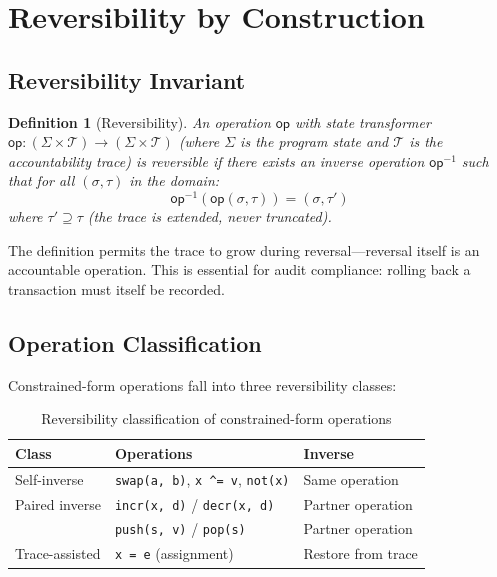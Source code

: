\documentclass[11pt,a4paper]{article}
\newtheorem{definition}[theorem]{Definition}
\newcommand{\inv}[1]{#1^{-1}}
\begin{document}
\section{Reversibility by Construction}
\label{sec:reversibility}

\subsection{Reversibility Invariant}

\begin{definition}[Reversibility]
\label{def:reversibility}
An operation $\mathsf{op}$ with state transformer
$\mathsf{op} : (\Sigma \times \mathcal{T}) \to (\Sigma \times \mathcal{T})$
(where $\Sigma$ is the program state and $\mathcal{T}$ is the accountability
trace) is \emph{reversible} if there exists an inverse operation
$\inv{\mathsf{op}}$ such that for all $(\sigma, \tau)$ in the domain:
\[
  \inv{\mathsf{op}}(\mathsf{op}(\sigma, \tau)) = (\sigma, \tau')
\]
where $\tau' \supseteq \tau$ (the trace is extended, never truncated).
\end{definition}

The definition permits the trace to grow during reversal---reversal itself is
an accountable operation.  This is essential for audit compliance: rolling
back a transaction must itself be recorded.

\subsection{Operation Classification}

Constrained-form operations fall into three reversibility classes:

\begin{table}[htbp]
\centering
\caption{Reversibility classification of constrained-form operations}
\label{tab:reversibility}
\begin{tabular}{@{}lll@{}}
\toprule
\textbf{Class} & \textbf{Operations} & \textbf{Inverse} \\
\midrule
Self-inverse & \texttt{swap(a, b)}, \texttt{x \^{}= v}, \texttt{not(x)} & Same operation \\
Paired inverse & \texttt{incr(x, d)} / \texttt{decr(x, d)} & Partner operation \\
 & \texttt{push(s, v)} / \texttt{pop(s)} & Partner operation \\
Trace-assisted & \texttt{x = e} (assignment) & Restore from trace \\
\bottomrule
\end{tabular}
\end{table}
\end{document}
